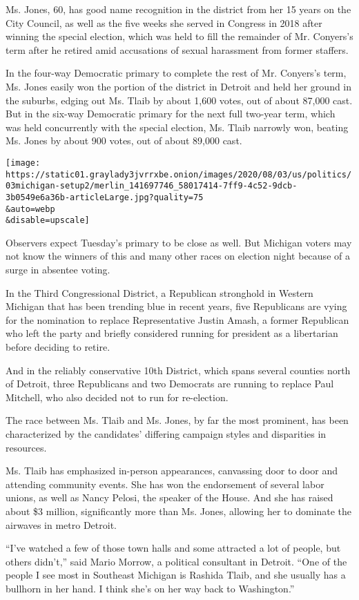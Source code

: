 Ms. Jones, 60, has good name recognition in the district from her 15
years on the City Council, as well as the five weeks she served in
Congress in 2018 after winning the special election, which was held to
fill the remainder of Mr. Conyers's term after he retired amid
accusations of sexual harassment from former staffers.

In the four-way Democratic primary to complete the rest of Mr. Conyers's
term, Ms. Jones easily won the portion of the district in Detroit and
held her ground in the suburbs, edging out Ms. Tlaib by about 1,600
votes, out of about 87,000 cast. But in the six-way Democratic primary
for the next full two-year term, which was held concurrently with the
special election, Ms. Tlaib narrowly won, beating Ms. Jones by about 900
votes, out of about 89,000 cast.

\texttt{[image: https://static01.graylady3jvrrxbe.onion/images/2020/08/03/us/politics/03michigan-setup2/merlin\_141697746\_58017414-7ff9-4c52-9dcb-3b0549e6a36b-articleLarge.jpg?quality=75\\\&auto=webp\\\&disable=upscale]}

Observers expect Tuesday's primary to be close as well. But Michigan
voters may not know the winners of this and many other races on election
night because of a surge in absentee voting.

In the Third Congressional District, a Republican stronghold in Western
Michigan that has been trending blue in recent years, five Republicans
are vying for the nomination to replace Representative Justin Amash, a
former Republican who left the party and briefly considered running for
president as a libertarian before deciding to retire.

And in the reliably conservative 10th District, which spans several
counties north of Detroit, three Republicans and two Democrats are
running to replace Paul Mitchell, who also decided not to run for
re-election.

The race between Ms. Tlaib and Ms. Jones, by far the most prominent, has
been characterized by the candidates' differing campaign styles and
disparities in resources.

Ms. Tlaib has emphasized in-person appearances, canvassing door to door
and attending community events. She has won the endorsement of several
labor unions, as well as Nancy Pelosi, the speaker of the House. And she
has raised about \$3 million, significantly more than Ms. Jones,
allowing her to dominate the airwaves in metro Detroit.

``I've watched a few of those town halls and some attracted a lot of
people, but others didn't,'' said Mario Morrow, a political consultant
in Detroit. ``One of the people I see most in Southeast Michigan is
Rashida Tlaib, and she usually has a bullhorn in her hand. I think she's
on her way back to Washington.''

